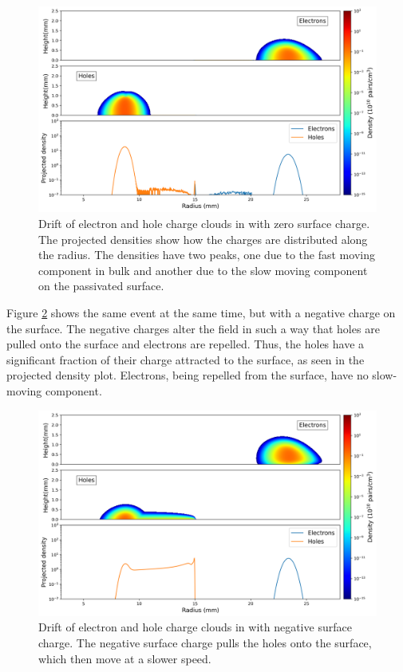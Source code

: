 \begin{figure}%
    \includegraphics[trim={0cm 0 0cm 0},clip,width=0.99\linewidth]{ch3/figs/drift_path_sc=0.0.png}
    \caption{Drift of electron and hole charge clouds in {\ehd} with zero surface charge. The projected densities show how the charges are distributed along the radius. The densities have two peaks, one due to the fast moving component in bulk and another due to the slow moving component on the passivated surface.}
    \label{ch3_fig_ehd_path_pd_sc_0}
\end{figure}

Figure \ref{ch3_fig_ehd_path_pd_sc_neg_0p3} shows the same event at the same time, but with a negative charge on the surface. The negative charges alter the field in such a way that holes are pulled onto the surface and electrons are repelled. Thus, the holes have a significant fraction of their charge attracted to the surface, as seen in the projected density plot. Electrons, being repelled from the surface, have no slow-moving component.


\begin{figure}%
    \includegraphics[trim={0cm 0 0cm 0},clip,width=0.99\linewidth]{ch3/figs/drift_path_sc=-0.3.png}
    \caption{Drift of electron and hole charge clouds in {\ehd} with negative surface charge. The negative surface charge pulls the holes onto the surface, which then move at a slower speed.}
    \label{ch3_fig_ehd_path_pd_sc_neg_0p3}
\end{figure}

